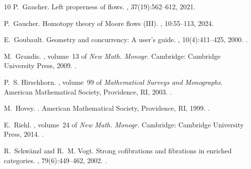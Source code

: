 \documentclass[12pt,a4paper]{amsart}
\theoremstyle{definition}
\begin{document}
\begin{thebibliography}{10}
	P.~Gaucher.
	\newblock Left properness of flows.
	, 37(19):562--612, 2021.
	
	P.~Gaucher.
	\newblock Homotopy theory of {M}oore flows ({III}).
	, 10:55--113, 2024.
	
	E.~Goubault.
	\newblock Geometry and concurrency: {A} user's guide.
	, 10(4):411--425, 2000.
	\newblock \href {https://doi.org/10.1017/S0960129500003133}
	{}.
	
	M.~Grandis.
	,
	volume~13 of {\em New Math. Monogr.}
	\newblock Cambridge: Cambridge University Press, 2009.
	\newblock \href {https://doi.org/10.1017/CBO9780511657474}
	{}.
	
	P.~S. Hirschhorn.
	, volume~99 of {\em
		Mathematical Surveys and Monographs}.
	\newblock American Mathematical Society, Providence, RI, 2003.
	\newblock \href {https://doi.org/10.1090/surv/099}
	{}.
	
	M.~Hovey.
	.
	\newblock American Mathematical Society, Providence, RI, 1999.
	\newblock \href {https://doi.org/10.1090/surv/063}
	{}.
	
	E.~Riehl.
	, volume~24 of {\em New Math.
		Monogr.}
	\newblock Cambridge: Cambridge University Press, 2014.
	\newblock \href {https://doi.org/10.1017/CBO9781107261457}
	{}.
	
	R.~Schw{\"a}nzl and R.~M. Vogt.
	\newblock Strong cofibrations and fibrations in enriched categories.
	, 79(6):449--462, 2002.
	\newblock \href {https://doi.org/10.1007/PL00012472}
	{}.
	
\end{thebibliography}


% 
% 
\end{document}
